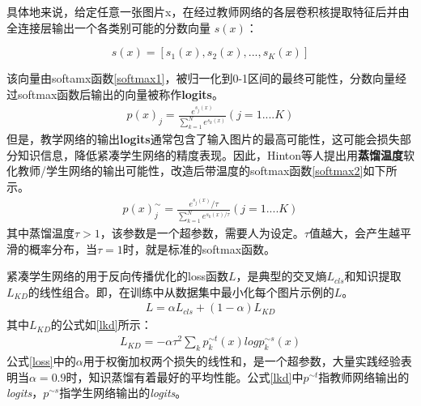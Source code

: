 具体地来说，给定任意一张图片x，在经过教师网络的各层卷积核提取特征后并由全连接层输出一个各类别可能的分数向量 $s(x)$：

\begin{equation}
s(x) = [s_1(x),s_2(x),...,s_K(x)]
\end{equation}

该向量由softamx函数\ref{softmax1}，被归一化到0-1区间的最终可能性，分数向量经过softmax函数后输出的向量被称作\textbf{logits}。
\begin{equation}
\begin{aligned}
\label{softmax1}
p(x)_j = \frac{e^{s_j(x)}}{\sum_{k=1}^N e^{s_k(x)}}  (j=1....K)
\end{aligned}
\end{equation}
但是，教学网络的输出\textbf{logits}通常包含了输入图片的最高可能性，这可能会损失部分知识信息，降低紧凑学生网络的精度表现。因此，Hinton等人\cite{hinton2015distilling}提出用\textbf{蒸馏温度}软化教师/学生网络的输出可能性，改造后带温度的softmax函数\ref{softmax2}如下所示。
\begin{equation}
\begin{aligned}
\label{softmax2}
p(x)^{\sim}_j = \frac{e^{s_j(x)}/\tau}{\sum_{k=1}^N e^{s_k(x)/\tau}}  (j=1....K)
\end{aligned}
\end{equation}
其中蒸馏温度$\tau>1$，该参数是一个超参数，需要人为设定。$\tau$值越大，会产生越平滑的概率分布，当$\tau=1$时，就是标准的softmax函数。

紧凑学生网络的用于反向传播优化的loss函数$L$，是典型的交叉熵$L_{cls}$和知识提取$L_{KD}$的线性组合。即，在训练中从数据集中最小化每个图片示例的$L$。
\begin{equation}
\begin{aligned}
\label{loss}
L = \alpha L_{cls} + (1 - \alpha)L_{KD}
\end{aligned}
\end{equation}
其中$L_{KD}$的公式如\ref{lkd}所示：
\begin{equation}
\begin{aligned}
\label{lkd}
L_{KD} = -\alpha \tau^2 \sum_{k}p^{\sim t}_{k}(x)logp^{\sim s}_{k}(x)
\end{aligned}
\end{equation}
公式\ref{loss}中的$\alpha$用于权衡加权两个损失的线性和，是一个超参数，大量实践经验\cite{zagoruyko2016paying,huang2017like,lan2018knowledge,hinton2015distilling}表明当$\alpha=0.9$时，知识蒸馏有着最好的平均性能。公式\ref{lkd}中$p^{\sim t}$指教师网络输出的\emph{logits}，$p^{\sim s}$指学生网络输出的\emph{logits}。



